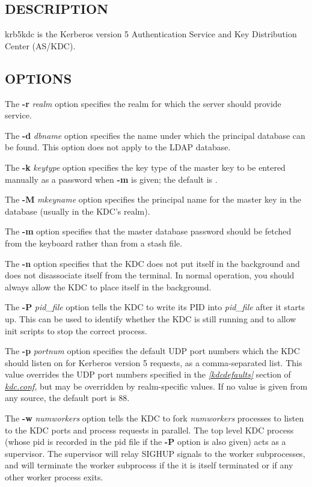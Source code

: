 \documentclass[letterpaper,10pt,english]{sphinxmanual}
\begin{document}
\subsection{DESCRIPTION}
\label{admin/admin_commands/krb5kdc:description}
krb5kdc is the Kerberos version 5 Authentication Service and Key
Distribution Center (AS/KDC).


\subsection{OPTIONS}
\label{admin/admin_commands/krb5kdc:options}
The \textbf{-r} \emph{realm} option specifies the realm for which the server
should provide service.

The \textbf{-d} \emph{dbname} option specifies the name under which the
principal database can be found.  This option does not apply to the
LDAP database.

The \textbf{-k} \emph{keytype} option specifies the key type of the master key
to be entered manually as a password when \textbf{-m} is given; the default
is .

The \textbf{-M} \emph{mkeyname} option specifies the principal name for the
master key in the database (usually  in the KDC's realm).

The \textbf{-m} option specifies that the master database password should
be fetched from the keyboard rather than from a stash file.

The \textbf{-n} option specifies that the KDC does not put itself in the
background and does not disassociate itself from the terminal.  In
normal operation, you should always allow the KDC to place itself in
the background.

The \textbf{-P} \emph{pid\_file} option tells the KDC to write its PID into
\emph{pid\_file} after it starts up.  This can be used to identify whether
the KDC is still running and to allow init scripts to stop the correct
process.

The \textbf{-p} \emph{portnum} option specifies the default UDP port numbers
which the KDC should listen on for Kerberos version 5 requests, as a
comma-separated list.  This value overrides the UDP port numbers
specified in the {\hyperref[admin/conf_files/kdc_conf:kdcdefaults]{\emph{{[}kdcdefaults{]}}}} section of {\hyperref[admin/conf_files/kdc_conf:kdc-conf-5]{\emph{kdc.conf}}}, but
may be overridden by realm-specific values.  If no value is given from
any source, the default port is 88.

The \textbf{-w} \emph{numworkers} option tells the KDC to fork \emph{numworkers}
processes to listen to the KDC ports and process requests in parallel.
The top level KDC process (whose pid is recorded in the pid file if
the \textbf{-P} option is also given) acts as a supervisor.  The supervisor
will relay SIGHUP signals to the worker subprocesses, and will
terminate the worker subprocess if the it is itself terminated or if
any other worker process exits.
\end{document}
